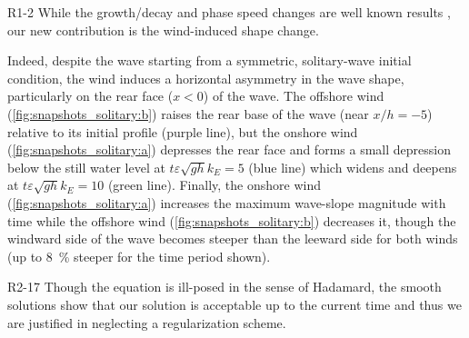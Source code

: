 \documentclass{jfm}
\renewcommand*{\epsilon}{\varepsilon}
\begin{document}
\begin{LineLabel}{R1-2}
While the growth/decay and phase speed changes are well known results
\citep[\eg][]{jeffreys1925formation,miles1957generation}, our new
contribution is the wind-induced shape change.
\end{LineLabel}
Indeed, despite the wave starting from a symmetric, solitary-wave
initial condition, the wind induces a horizontal asymmetry in the wave
shape, particularly on the rear face ($x<0$) of the wave.
The offshore wind (\cref{fig:snapshots_solitary:b}) raises the
rear base of the wave (near $x/h = -5$) relative to its initial profile
(purple line), but the onshore wind (\cref{fig:snapshots_solitary:a})
depresses the rear face and forms a small depression below the still
water level at $t\epsilon \sqrt{gh} k_E=5$ (blue line) which widens and
deepens at $t\epsilon \sqrt{gh} k_E=10$ (green line).
Finally, the onshore wind (\cref{fig:snapshots_solitary:a})
increases the maximum wave-slope magnitude with time while the offshore
wind (\cref{fig:snapshots_solitary:b}) decreases it, though the windward
side of the wave becomes steeper than the leeward side for both winds
(up to \SI{8}{\percent} steeper for the time period shown).
\begin{LineLabel}{R2-17}
Though the equation is ill-posed in the sense of Hadamard, the smooth
solutions show that our solution is acceptable up to the current time
and thus we are justified in neglecting a regularization scheme.
\end{LineLabel}
\end{document}
